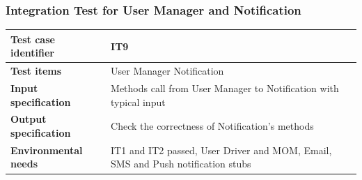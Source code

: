 \documentclass{article}
\begin{document}
			\subsubsection{Integration Test for User Manager and Notification} \label{sec:3.1.7}
				\begin{minipage}{\linewidth}
				\end{minipage}
				\begin{center}
					\setlength{\tabcolsep}{24pt}
					\renewcommand{\arraystretch}{1.4}
					\begin{tabular}{ | l | p{8cm} |}\hline
						\textbf{Test case identifier} & IT9\\\hline
						\textbf{Test items} & User Manager \textrightarrow Notification\\\hline
						\textbf{Input specification} & Methods call from User Manager to Notification with typical input \\\hline
						\textbf{Output specification} & Check the correctness of Notification's methods \\\hline
						\textbf{Environmental needs} & IT1 and IT2 passed, User Driver and MOM, Email, SMS and Push notification stubs \\\hline
					\end{tabular}
				\end{center}
				\pagebreak
\end{document}
